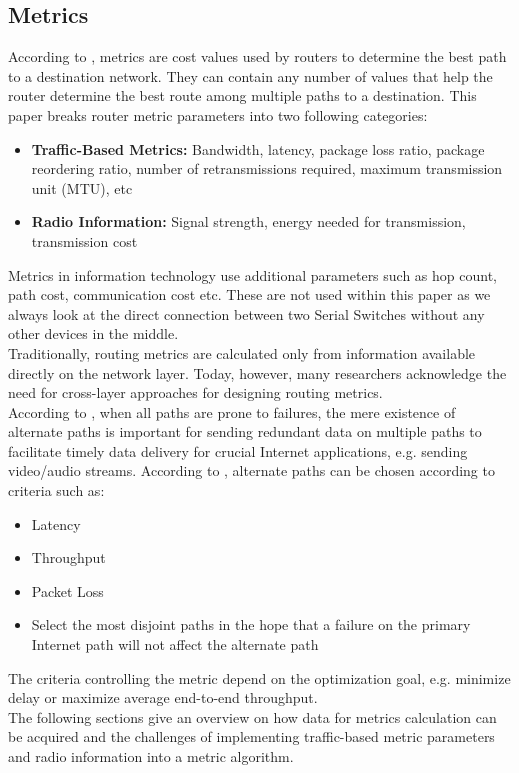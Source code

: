 \subsection{Metrics}
According to \cite{RouterMetrics_Wiki}, metrics are cost values used by routers to determine the best path to a destination network. They can contain any number of values that help the router determine the best route among multiple paths to a destination. This paper breaks router metric parameters into two following categories:
\begin{itemize}
    \item \textbf{Traffic-Based Metrics:} Bandwidth, latency, package loss ratio, package reordering ratio, number of retransmissions required, maximum transmission unit (MTU), etc
    \item \textbf{Radio Information:} Signal strength, energy needed for transmission, transmission cost
\end{itemize}
Metrics in information technology use additional parameters such as hop count, path cost, communication cost etc. These are not used within this paper as we always look at the direct connection between two Serial Switches without any other devices in the middle.\\
Traditionally, routing metrics are calculated only from information available directly on the network layer. Today, however, many researchers acknowledge the need for cross-layer approaches for designing routing metrics.\\
According to \cite{SurveyOnRoutingMetrics}, when all paths are prone to failures, the mere existence of alternate paths is important for sending redundant data on multiple paths to facilitate timely data delivery for crucial Internet applications, e.g. sending video/audio streams. According to \cite{AlternativeInternetPaths}, alternate paths can be chosen according to criteria such as:
\begin{itemize}
    \item Latency
    \item Throughput
    \item Packet Loss
    \item Select the most disjoint  paths in the hope that a failure on the primary Internet path will not affect the alternate path
\end{itemize}
The criteria controlling the metric depend on the optimization goal, e.g. minimize delay or maximize average end-to-end throughput.\\
The following sections give an overview on how data for metrics calculation can be acquired and the challenges of implementing traffic-based metric parameters and radio information into a metric algorithm.
%
